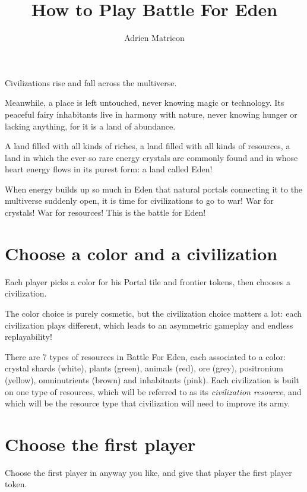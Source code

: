 \documentclass[a4paper]{article}
\author{Adrien Matricon}
\begin{document}
\title{How to Play Battle For Eden}
\maketitle


    Civilizations rise and fall across the multiverse.

    Meanwhile, a place is left untouched, never knowing magic or technology.
    Its peaceful fairy inhabitants live in harmony with nature,
    never knowing hunger or lacking anything, for it is a land of abundance.

    A land filled with all kinds of riches, a land filled with all kinds of resources,
    a land in which the ever so rare energy crystals are commonly found
    and in whose heart energy flows in its purest form: a land called Eden!

    When energy builds up so much in Eden that natural portals 
    connecting it to the multiverse suddenly open,
    it is time for civilizations to go to war!
    War for crystals! War for resources! This is the battle for Eden!



\section{Choose a color and a civilization}

    Each player picks a color for his Portal tile and frontier tokens,
    then chooses a civilization.
    
    The color choice is purely cosmetic,
    but the civilization choice matters a lot: each civilization plays different,
    which leads to an asymmetric gameplay and endless replayability!
    
    There are 7 types of resources in Battle For Eden,
    each associated to a color:
    crystal shards (white), plants (green), animals (red), ore (grey),
    positronium (yellow), omninutrients (brown) and inhabitants (pink).
    Each civilization is built on one type of resources,
    which will be referred to as its \textit{civilization resource},
    and which will be the resource type that civilization will need
    to improve its army.
    
\section{Choose the first player}
    Choose the first player in anyway you like,
    and give that player the first player token.
\end{document}
